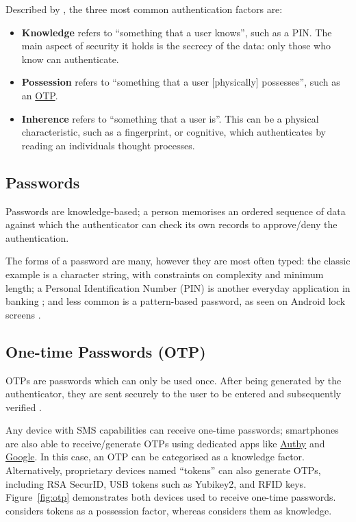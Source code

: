 Described by \cite{surveyOnAuthFactors}, the three most
common authentication factors are: 

\begin{itemize} 

  \item \textbf{Knowledge} \label{p:knowledge} refers to
        \enquote{something that a user knows}, such as a PIN.
        The main aspect of security it holds is the secrecy of the
        data: only those who know can authenticate.

  \item \textbf{Possession} refers to \enquote{something
          that a user [physically] possesses}, such as an
        \hyperref[ss:otp]{OTP}.

  \item \textbf{Inherence} refers to \enquote{something
          that a user is}.
        This can be a physical characteristic, such as a
        fingerprint, or cognitive, which authenticates by reading
        an individuals thought processes.
\end{itemize}

\subsection{Passwords}
\label{ss:passwords}
Passwords are knowledge-based; a person memorises an
ordered sequence of data against which the authenticator
can check its own records to approve/deny the
authentication.

The forms of a password are many, however they are most
often typed: the classic example is a character string,
with  constraints on complexity and minimum length; a
Personal Identification Number (PIN) is another everyday
application in banking \parencite{whatIsAuth}; and less
common is a pattern-based password, as seen on Android lock
screens \parencite{androidLockScreen}.

\subsection{One-time Passwords (OTP)}
\label{ss:otp}

OTPs are passwords which can only be used once.
After being generated by the authenticator, they are sent
securely to the user to be entered and subsequently
verified \parencite{surveyOnAuthFactors}.

Any device with SMS capabilities can receive one-time
passwords; smartphones are also able to receive/generate
OTPs using dedicated apps like
\href{https://www.twilio.com/authy/features/totp}{Authy}
and \href{https://play.google.com/store/apps/details?
  id=com.google.android.apps.authenticator2}{Google}.
In this case, an OTP can be categorised as a knowledge
factor\parencite{surveyOnAuthFactors, evalOfAuthMethods}.
Alternatively, proprietary devices named \enquote{tokens}
can also generate OTPs, including RSA SecurID, USB tokens
such as Yubikey2, and RFID keys.
Figure~\ref{fig:otp} demonstrates both devices used to
receive one-time passwords.
\cite{evalOfAuthMethods} considers tokens
as a possession factor, whereas
\cite{surveyOnAuthFactors} considers them as
knowledge.

